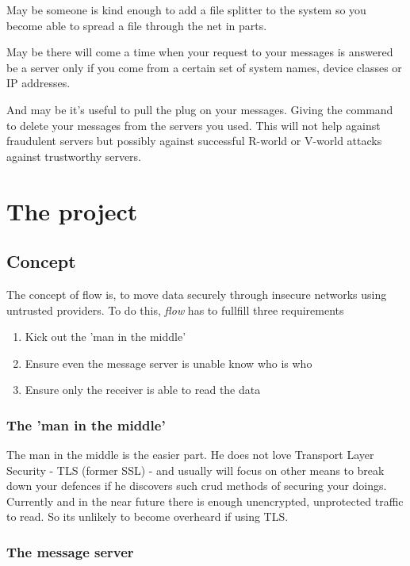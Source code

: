 \documentclass[twoside,a4paper,english,12pt,authoryear,openright]{book}
\newcommand{\flow}{\textit{flow} }
\begin{document}
May be someone is kind enough to add a file splitter to the system so you become able to spread a file through the net in parts.

May be there will come a time when your request to your messages is answered be a server only if you come from a certain set of system names, device classes or IP addresses.

And may be it's useful to pull the plug on your messages. Giving the command to delete your messages from the servers you used. This will not help against fraudulent servers but possibly against successful R-world or V-world attacks against trustworthy servers.

\chapter{The project}

\section{Concept}

The concept of flow is, to move data securely through insecure networks using untrusted providers. To do this, \flow has to fullfill three requirements

\begin{enumerate}
\item{Kick out the 'man in the middle'}
\item{Ensure even the message server is unable know who is who}
\item{Ensure only the receiver is able to read the data}
\end{enumerate}

\subsection{The 'man in the middle'}

The man in the middle is the easier part. He does not love Transport Layer Security - TLS (former SSL) - and usually will focus on other means to break down your defences if he discovers such crud methods of securing your doings. Currently and in the near future there is enough unencrypted, unprotected traffic to read. So its unlikely to become overheard if using TLS.

\subsection{The message server}
\end{document}
